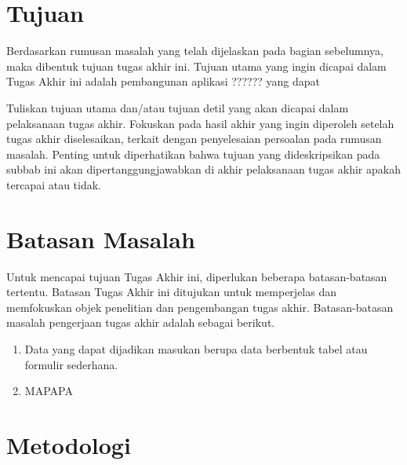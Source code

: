 \section{Tujuan}

Berdasarkan rumusan masalah yang telah dijelaskan pada bagian sebelumnya, maka dibentuk tujuan tugas akhir ini. Tujuan utama yang ingin dicapai dalam Tugas Akhir ini adalah pembangunan aplikasi ?????? yang dapat 

Tuliskan tujuan utama dan/atau tujuan detil yang akan dicapai dalam pelaksanaan tugas akhir. Fokuskan pada hasil akhir yang ingin diperoleh setelah tugas akhir diselesaikan, terkait dengan penyelesaian persoalan pada rumusan masalah. Penting untuk diperhatikan bahwa tujuan yang dideskripsikan pada subbab ini akan dipertanggungjawabkan di akhir pelaksanaan tugas akhir apakah tercapai atau tidak.

\section{Batasan Masalah}

Untuk mencapai tujuan Tugas Akhir ini, diperlukan beberapa batasan-batasan tertentu. Batasan Tugas Akhir ini ditujukan untuk memperjelas dan memfokuskan objek penelitian dan pengembangan tugas akhir. Batasan-batasan masalah pengerjaan tugas akhir adalah sebagai berikut.

\begin{enumerate}
    \item Data yang dapat dijadikan masukan berupa data berbentuk tabel atau formulir sederhana.
    \item MAPAPA
\end{enumerate}

\section{Metodologi}

